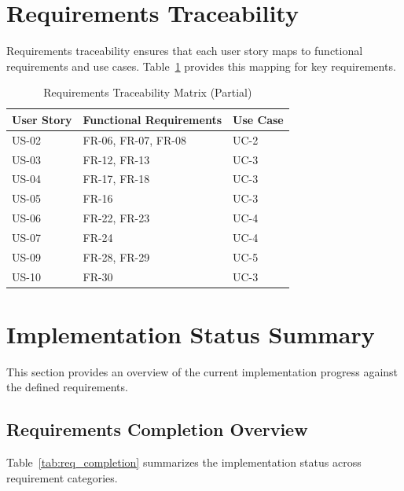 \section{Requirements Traceability}
\label{sec:traceability}

Requirements traceability ensures that each user story maps to functional requirements and use cases. Table~\ref{tab:traceability} provides this mapping for key requirements.

\begin{table}[htbp]
    \centering
    \caption{Requirements Traceability Matrix (Partial)}
    \label{tab:traceability}
    \begin{tabular}{|l|l|l|}
        \hline
        \textbf{User Story} & \textbf{Functional Requirements} & \textbf{Use Case} \\
        \hline
        US-02 & FR-06, FR-07, FR-08 & UC-2 \\
        \hline
        US-03 & FR-12, FR-13 & UC-3 \\
        \hline
        US-04 & FR-17, FR-18 & UC-3 \\
        \hline
        US-05 & FR-16 & UC-3 \\
        \hline
        US-06 & FR-22, FR-23 & UC-4 \\
        \hline
        US-07 & FR-24 & UC-4 \\
        \hline
        US-09 & FR-28, FR-29 & UC-5 \\
        \hline
        US-10 & FR-30 & UC-3 \\
        \hline
    \end{tabular}
\end{table}

\section{Implementation Status Summary}
\label{sec:impl_status}

This section provides an overview of the current implementation progress against the defined requirements.

\subsection{Requirements Completion Overview}

Table~\ref{tab:req_completion} summarizes the implementation status across requirement categories.

